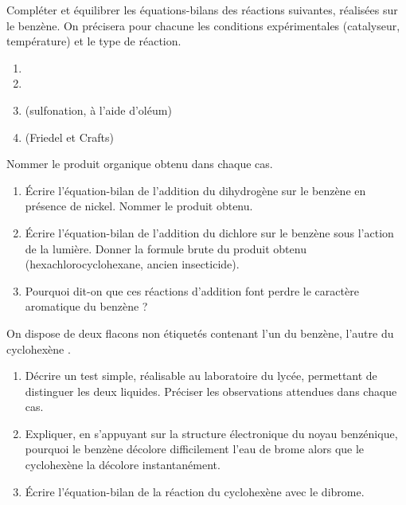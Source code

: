 \documentclass[11pt]{article}
\begin{document}
\begin{exercice}
Compléter et équilibrer les équations-bilans des réactions suivantes, réalisées sur le benzène. On précisera pour chacune les conditions expérimentales (catalyseur, température) et le type de réaction.
\begin{enumerate}
\item {}
\item {}
\item {} (sulfonation, à l'aide d'oléum)
\item {} (Friedel et Crafts)
\end{enumerate}
Nommer le produit organique obtenu dans chaque cas.
\end{exercice}

\begin{exercice}
\begin{enumerate}
\item Écrire l'équation-bilan de l'addition du dihydrogène sur le benzène en présence de nickel. Nommer le produit obtenu.
\item Écrire l'équation-bilan de l'addition du dichlore sur le benzène sous l'action de la lumière. Donner la formule brute du produit obtenu (hexachlorocyclohexane, ancien insecticide).
\item Pourquoi dit-on que ces réactions d'addition font \og perdre \fg{} le caractère aromatique du benzène ?
\end{enumerate}
\end{exercice}

\begin{exercice}
On dispose de deux flacons non étiquetés contenant l'un du benzène, l'autre du cyclohexène .
\begin{enumerate}
\item Décrire un test simple, réalisable au laboratoire du lycée, permettant de distinguer les deux liquides. Préciser les observations attendues dans chaque cas.
\item Expliquer, en s'appuyant sur la structure électronique du noyau benzénique, pourquoi le benzène décolore difficilement l'eau de brome alors que le cyclohexène la décolore instantanément.
\item Écrire l'équation-bilan de la réaction du cyclohexène avec le dibrome.
\end{enumerate}
\end{exercice}
\end{document}
